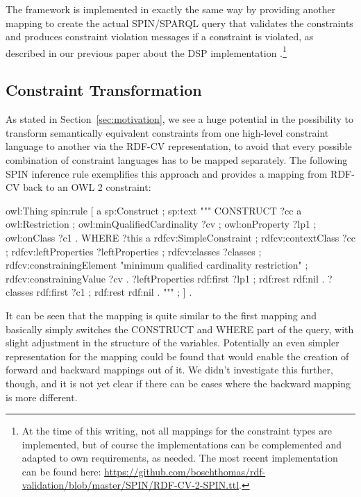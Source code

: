 \documentclass[a4paper,fontsize=11pt]{scrartcl}
\begin{document}
The framework is implemented in exactly the same way by providing another mapping to create the actual SPIN/SPARQL query that validates the constraints and produces constraint violation messages if a constraint is violated, as described in our previous paper about the DSP implementation \cite{BoschEckert2014-2}.\footnote{At the time of this writing, not all mappings for the constraint types are implemented, but of course the implementations can be complemented and adapted to own requirements, as needed. The most recent implementation can be found here: \url{https://github.com/boschthomas/rdf-validation/blob/master/SPIN/RDF-CV-2-SPIN.ttl}.}

\subsection{Constraint Transformation}

As stated in Section~\ref{sec:motivation}, we see a huge potential in the possibility to transform semantically equivalent constraints from one high-level constraint language to another via the RDF-CV representation, to avoid that every possible combination of constraint languages has to be mapped separately. The following SPIN inference rule exemplifies this approach and provides a mapping from RDF-CV back to an OWL 2 constraint:


\begin{ex}
owl:Thing 
    spin:rule [ a sp:Construct ; sp:text """
        CONSTRUCT {            
            ?cc
                a owl:Restriction ;
                owl:minQualifiedCardinality ?cv ;
                owl:onProperty ?lp1 ;
                owl:onClass ?c1 . }
        WHERE { 
            ?this
                a rdfcv:SimpleConstraint ;
                rdfcv:contextClass ?cc ;
                rdfcv:leftProperties ?leftProperties ;
                rdfcv:classes ?classes ;
                rdfcv:constrainingElement "minimum qualified cardinality restriction" ;
                rdfcv:constrainingValue ?cv .  
            ?leftProperties 
                rdf:first ?lp1 ;
                rdf:rest rdf:nil .    
            ?classes 
                rdf:first ?c1 ;
                rdf:rest rdf:nil . } """ ; ] .
\end{ex}

It can be seen that the mapping is quite similar to the first mapping and basically simply switches the CONSTRUCT and WHERE part of the query, with slight adjustment in the structure of the variables. Potentially an even simpler representation for the mapping could be found that would enable the creation of forward and backward mappings out of it. We didn't investigate this further, though, and it is not yet clear if there can be cases where the backward mapping is more different.
\end{document}
